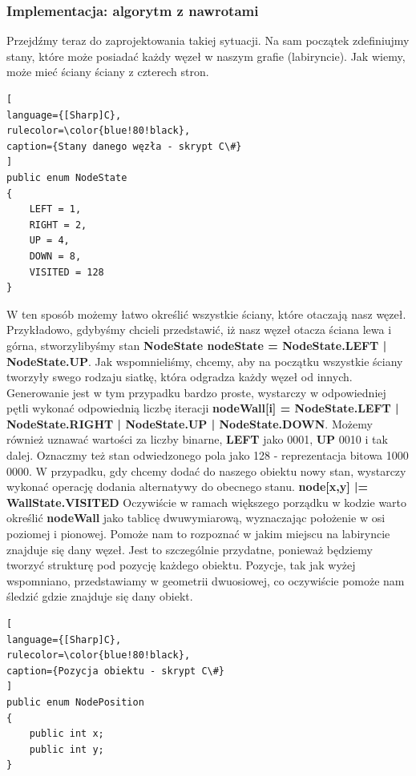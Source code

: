 \documentclass[oneside,polski,logo]{amuthesis}
\begin{document}
\subsubsection{Implementacja: algorytm z nawrotami}
Przejdźmy teraz do zaprojektowania takiej sytuacji. Na sam początek zdefiniujmy stany, które może posiadać każdy węzeł w naszym grafie (labiryncie). Jak wiemy, może mieć ściany ściany z czterech stron. 
\begin{lstlisting}[
language={[Sharp]C},
rulecolor=\color{blue!80!black},
caption={Stany danego węzła - skrypt C\#}
]
public enum NodeState
{
    LEFT = 1,
    RIGHT = 2,
    UP = 4,
    DOWN = 8,
    VISITED = 128
}
\end{lstlisting}
W ten sposób możemy łatwo określić wszystkie ściany, które otaczają nasz węzeł. Przykładowo, gdybyśmy chcieli przedstawić, iż nasz węzeł otacza ściana lewa i górna, stworzylibyśmy stan \textbf{NodeState nodeState = NodeState.LEFT | NodeState.UP}. Jak wspomnieliśmy, chcemy, aby na początku wszystkie ściany tworzyły swego rodzaju siatkę, która odgradza każdy węzeł od innych. Generowanie jest w tym przypadku bardzo proste, wystarczy w odpowiedniej pętli wykonać odpowiednią liczbę iteracji \textbf{nodeWall[i] = NodeState.LEFT | NodeState.RIGHT | NodeState.UP | NodeState.DOWN}. Możemy również uznawać wartości za liczby binarne, \textbf{LEFT} jako 0001, \textbf{UP} 0010 i tak dalej. Oznaczmy też stan odwiedzonego pola jako 128 - reprezentacja bitowa 1000 0000. W przypadku, gdy chcemy dodać do naszego obiektu nowy stan, wystarczy wykonać operację dodania alternatywy do obecnego stanu. \textbf{node[x,y] |= WallState.VISITED} Oczywiście w ramach większego porządku w kodzie warto określić \textbf{nodeWall} jako tablicę dwuwymiarową, wyznaczając położenie w osi poziomej i pionowej. Pomoże nam to rozpoznać w jakim miejscu na labiryncie znajduje się dany węzeł. Jest to szczególnie przydatne, ponieważ będziemy tworzyć strukturę pod pozycję każdego obiektu. Pozycje, tak jak wyżej wspomniano, przedstawiamy w geometrii dwuosiowej, co oczywiście pomoże nam śledzić gdzie znajduje się dany obiekt. 
\begin{lstlisting}[
language={[Sharp]C},
rulecolor=\color{blue!80!black},
caption={Pozycja obiektu - skrypt C\#}
]
public enum NodePosition
{
	public int x;
	public int y;
}
\end{lstlisting}
\end{document}
